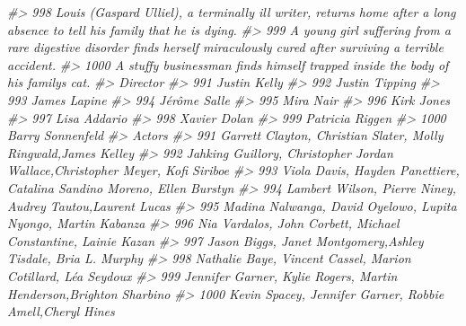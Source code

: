 \documentclass[
]{book}
\newenvironment{Shaded}{\begin{snugshade}}{\end{snugshade}}
\newcommand{\CommentTok}[1]{\textcolor[rgb]{0.56,0.35,0.01}{\textit{#1}}}
\begin{document}
\begin{Shaded}
\begin{Highlighting}[]
\CommentTok{\#\textgreater{} 998                                                                                                                        Louis (Gaspard Ulliel), a terminally ill writer, returns home after a long absence to tell his family that he is dying.}
\CommentTok{\#\textgreater{} 999                                                                                                                    A young girl suffering from a rare digestive disorder finds herself miraculously cured after surviving a terrible accident.}
\CommentTok{\#\textgreater{} 1000                                                                                                                                                               A stuffy businessman finds himself trapped inside the body of his family\textquotesingle{}s cat.}
\CommentTok{\#\textgreater{}              Director}
\CommentTok{\#\textgreater{} 991      Justin Kelly}
\CommentTok{\#\textgreater{} 992    Justin Tipping}
\CommentTok{\#\textgreater{} 993      James Lapine}
\CommentTok{\#\textgreater{} 994      Jérôme Salle}
\CommentTok{\#\textgreater{} 995         Mira Nair}
\CommentTok{\#\textgreater{} 996        Kirk Jones}
\CommentTok{\#\textgreater{} 997      Lisa Addario}
\CommentTok{\#\textgreater{} 998      Xavier Dolan}
\CommentTok{\#\textgreater{} 999   Patricia Riggen}
\CommentTok{\#\textgreater{} 1000 Barry Sonnenfeld}
\CommentTok{\#\textgreater{}                                                                            Actors}
\CommentTok{\#\textgreater{} 991                Garrett Clayton, Christian Slater, Molly Ringwald,James Kelley}
\CommentTok{\#\textgreater{} 992  Jahking Guillory, Christopher Jordan Wallace,Christopher Meyer, Kofi Siriboe}
\CommentTok{\#\textgreater{} 993        Viola Davis, Hayden Panettiere, Catalina Sandino Moreno, Ellen Burstyn}
\CommentTok{\#\textgreater{} 994                     Lambert Wilson, Pierre Niney, Audrey Tautou,Laurent Lucas}
\CommentTok{\#\textgreater{} 995                Madina Nalwanga, David Oyelowo, Lupita Nyong\textquotesingle{}o, Martin Kabanza}
\CommentTok{\#\textgreater{} 996                 Nia Vardalos, John Corbett, Michael Constantine, Lainie Kazan}
\CommentTok{\#\textgreater{} 997                  Jason Biggs, Janet Montgomery,Ashley Tisdale, Bria L. Murphy}
\CommentTok{\#\textgreater{} 998                  Nathalie Baye, Vincent Cassel, Marion Cotillard, Léa Seydoux}
\CommentTok{\#\textgreater{} 999             Jennifer Garner, Kylie Rogers, Martin Henderson,Brighton Sharbino}
\CommentTok{\#\textgreater{} 1000                     Kevin Spacey, Jennifer Garner, Robbie Amell,Cheryl Hines}

\end{Highlighting}
\end{Shaded}
\end{document}
